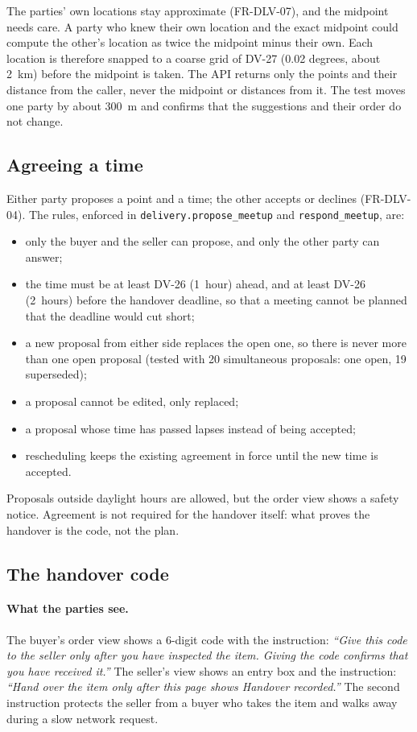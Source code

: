 \documentclass[11pt,a4paper]{article}
\begin{document}
The parties' own locations stay approximate (FR-DLV-07), and the midpoint needs care. A party who knew their own location and the exact midpoint could compute the other's location as twice the midpoint minus their own. Each location is therefore snapped to a coarse grid of DV-27 (0.02 degrees, about 2~km) before the midpoint is taken. The API returns only the points and their distance from the caller, never the midpoint or distances from it. The test moves one party by about 300~m and confirms that the suggestions and their order do not change.

\subsection{Agreeing a time}
Either party proposes a point and a time; the other accepts or declines (FR-DLV-04). The rules, enforced in \texttt{delivery.propose\_meetup} and \texttt{respond\_meetup}, are:
\begin{itemize}[nosep]
  \item only the buyer and the seller can propose, and only the other party can answer;
  \item the time must be at least DV-26 (1~hour) ahead, and at least DV-26 (2~hours) before the handover deadline, so that a meeting cannot be planned that the deadline would cut short;
  \item a new proposal from either side replaces the open one, so there is never more than one open proposal (tested with 20 simultaneous proposals: one open, 19 superseded);
  \item a proposal cannot be edited, only replaced;
  \item a proposal whose time has passed lapses instead of being accepted;
  \item rescheduling keeps the existing agreement in force until the new time is accepted.
\end{itemize}
Proposals outside daylight hours are allowed, but the order view shows a safety notice. Agreement is not required for the handover itself: what proves the handover is the code, not the plan.

\subsection{The handover code}
\label{sec:code}
\paragraph{What the parties see.} The buyer's order view shows a 6-digit code with the instruction: \emph{``Give this code to the seller only after you have inspected the item. Giving the code confirms that you have received it.''} The seller's view shows an entry box and the instruction: \emph{``Hand over the item only after this page shows Handover recorded.''} The second instruction protects the seller from a buyer who takes the item and walks away during a slow network request.
\end{document}
